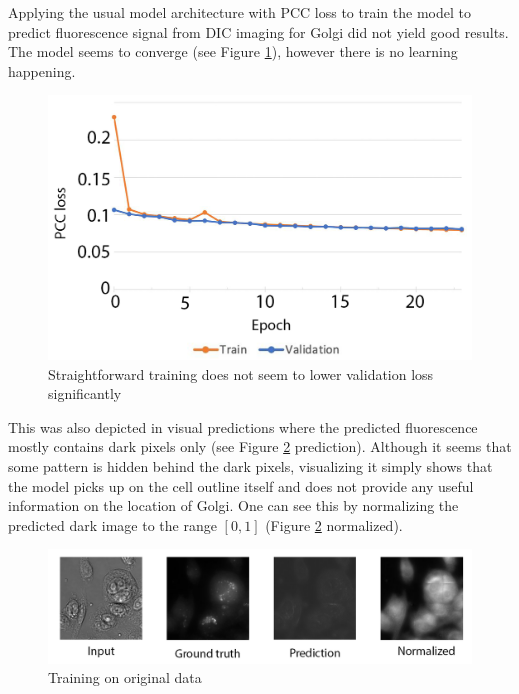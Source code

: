 Applying the usual model architecture with PCC loss to train the model to predict fluorescence signal from DIC imaging for Golgi did not yield good results. The model seems to converge (see Figure \ref{fig:golgi-no-reg-pcc}), however there is no learning happening.
\begin{figure}[H]
	\begin{center}
		\includegraphics[width=0.5\linewidth]{bilder/golgi/pcc-no-reg.png}
		\caption{Straightforward training does not seem to lower validation loss significantly}\label{fig:golgi-no-reg-pcc}
	\end{center}
\end{figure}

This was also depicted in visual predictions where the predicted fluorescence mostly contains dark pixels only (see Figure \ref{fig:golgi-no-reg-pcc-predictions} prediction). Although it seems that some pattern is hidden behind the dark pixels, visualizing it simply shows that the model picks up on the cell outline itself and does not provide any useful information on the location of Golgi. One can see this by normalizing the predicted dark image to the range $[0,1]$ (Figure \ref{fig:golgi-no-reg-pcc-predictions} normalized).
\begin{figure}[htb]
	\begin{center}
		\includegraphics[width=0.8\linewidth]{bilder/golgi/too-dark.png}
		\caption{Training on original data}\label{fig:golgi-no-reg-pcc-predictions}
	\end{center}
\end{figure}

